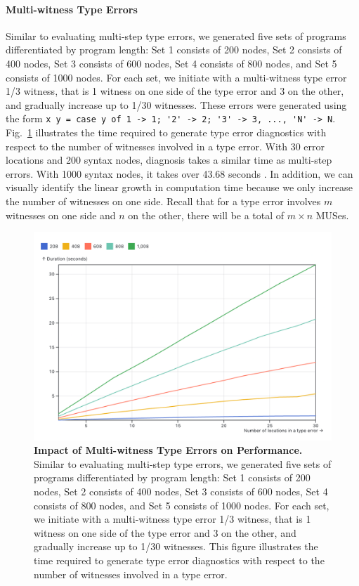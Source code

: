 \documentclass[pdflatex,lineno,sn-nature,Numbered]{sn-jnl}%
\begin{document}
\paragraph{Multi-witness Type Errors}

Similar to evaluating multi-step type errors, we generated five sets of programs differentiated by program length: Set 1 consists of 200 nodes, Set 2 consists of 400 nodes, Set 3 consists of 600 nodes, Set 4 consists of 800 nodes, and Set 5 consists of 1000 nodes. For each set, we initiate with a multi-witness type error 1/3 witness, that is 1 witness on one side of the type error and 3 on the other, and gradually increase up to 1/30 witnesses. These errors were generated using the form \lstinline{x y = case y of 1 -> 1; '2' -> 2; '3' -> 3, ..., 'N' -> N}. Fig.~\ref{fig:multi-witness-time} illustrates the time required to generate type error diagnostics with respect to the number of witnesses involved in a type error. With 30 error locations and 200 syntax nodes, diagnosis takes a similar time as multi-step errors. With 1000 syntax nodes, it takes over 43.68 seconds . In addition, we can visually identify the linear growth in computation time because we only increase the number of witnesses on one side. Recall that for a type error involves $m$ witnesses on one side and $n$ on the other, there will be a total of $m \times n$ MUSes.

\begin{figure}[ht]
    \centering
    \includegraphics[width=0.8\linewidth]{images/multi-witness-time.png}
    \caption{{\bf Impact of Multi-witness Type Errors on Performance.} Similar to evaluating multi-step type errors, we generated five sets of programs differentiated by program length: Set 1 consists of 200 nodes, Set 2 consists of 400 nodes, Set 3 consists of 600 nodes, Set 4 consists of 800 nodes, and Set 5 consists of 1000 nodes. For each set, we initiate with a multi-witness type error 1/3 witness, that is 1 witness on one side of the type error and 3 on the other, and gradually increase up to 1/30 witnesses. This figure illustrates the time required to generate type error diagnostics with respect to the number of witnesses involved in a type error.}
    \label{fig:multi-witness-time}
\end{figure}
\end{document}
